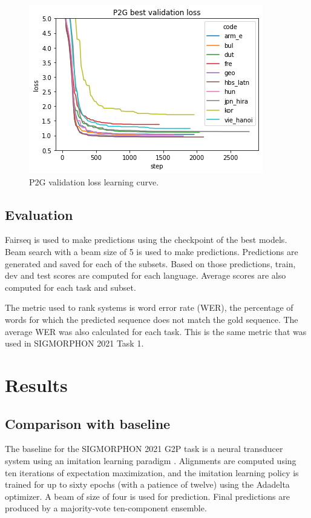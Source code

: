 \documentclass[11pt,a4paper]{article}
\begin{document}
\begin{figure}[ht]
    \centering
    \includegraphics[width=\linewidth]{p2g_loss.png}
    \caption{P2G validation loss learning curve.}
    \label{fig:p2g_loss}
\end{figure}

\subsection{Evaluation}

Fairseq is used to make predictions using the checkpoint of the best models. Beam search with a beam size of 5 is used to make predictions. Predictions are generated and saved for each of the subsets. Based on those predictions, train, dev and test scores are computed for each language. Average scores are also computed for each task and subset.

The metric used to rank systems is word error rate (WER), the percentage of words for which the predicted sequence does not match the gold sequence. The average WER was also calculated for each task. This is the same metric that was used in SIGMORPHON 2021 Task 1.

\section{Results}

\subsection{Comparison with baseline}

The baseline for the SIGMORPHON 2021 G2P task is a neural transducer system using an imitation learning paradigm \cite{makarov-clematide-2018-imitation}. Alignments are computed using ten iterations of expectation maximization, and the imitation learning policy is trained for up to sixty epochs (with a patience of twelve) using the Adadelta optimizer. A beam of size of four is used for prediction. Final predictions are produced by a majority-vote ten-component ensemble.
\end{document}
